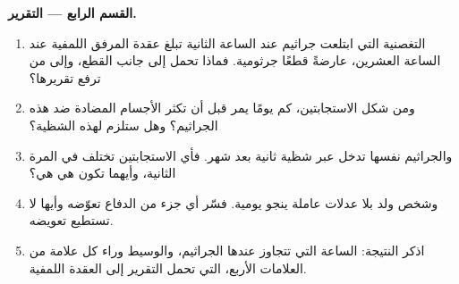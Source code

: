 \begin{problem}
\medskip
\noindent\textbf{القسم الرابع --- التقرير.}
\begin{enumerate}[resume]
  \item {} التغصنية التي ابتلعت جراثيم عند الساعة الثانية تبلغ
        عقدة المرفق اللمفية عند الساعة العشرين، عارضةً قطعًا جرثومية.
        فماذا تحمل إلى جانب القطع، وإلى من ترفع تقريرها؟
  \item ومن شكل الاستجابتين، كم يومًا يمر قبل أن تكثر الأجسام المضادة ضد هذه
        الجراثيم؟ وهل ستلزم لهذه الشظية؟
  \item والجراثيم نفسها تدخل عبر شظية ثانية بعد شهر. فأي الاستجابتين
        تختلف في المرة الثانية، وأيهما تكون هي هي؟
  \item وشخص ولد بلا عدلات عاملة ينجو  يومية. فسّر أي جزء
        من الدفاع تعوّضه  وأيها لا تستطيع تعويضه.
  \item اذكر النتيجة: الساعة التي تتجاوز عندها  الجراثيم،
        والوسيط وراء كل علامة من العلامات الأربع،  التي تحمل
        التقرير إلى العقدة اللمفية.
\end{enumerate}
\end{problem}

